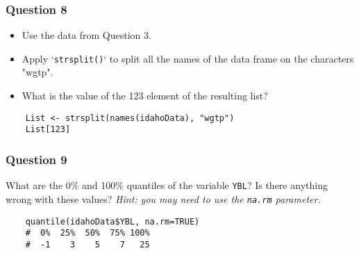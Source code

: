 \documentclass{beamer}
\begin{document}
\begin{frame}[fragile]
	
\frametitle{Question 8}
\begin{itemize}
	\item Use the data from Question 3.
	\item Apply `\texttt{strsplit()}` to split all the names of the data frame on the characters "wgtp". 
	\item What is the value of the 123 element of the resulting list?
\end{itemize}

\begin{framed} 
\begin{verbatim}
	List <- strsplit(names(idahoData), "wgtp")
	List[123]
\end{verbatim}
\end{framed} 

\end{frame}
\begin{frame}[fragile]
\frametitle{Question 9}

What are the 0\% and 100\% quantiles of the variable \texttt{YBL}? Is there anything wrong with these values?
\textit{ Hint: you may need to use the \texttt{na.rm} parameter.}

\begin{framed} 
	\begin{verbatim}
	quantile(idahoData$YBL, na.rm=TRUE)
	#  0%  25%  50%  75% 100% 
	#  -1    3    5    7   25 
	\end{verbatim}
\end{framed} 

\end{frame}
\end{document}
